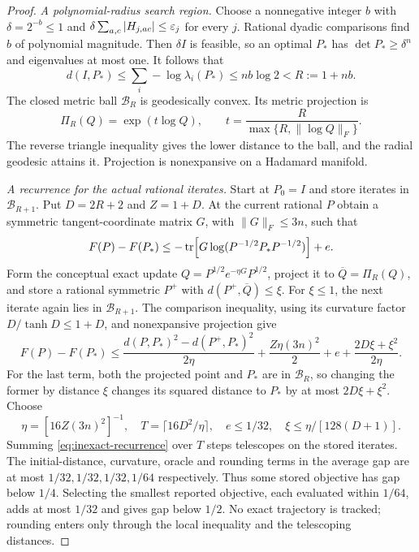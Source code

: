 \begin{proof}
\emph{A polynomial-radius search region.} Choose a nonnegative integer
$b$ with $\delta=2^{-b}\le1$ and
$\delta\sum_{a,c}|H_{j,ac}|\le\varepsilon_j$ for every $j$. Rational dyadic
comparisons find $b$ of polynomial magnitude. Then $\delta I$ is feasible,
so an optimal $P_*$ has $\det P_*\ge\delta^n$ and eigenvalues at most
one. It follows that
\[
 d(I,P_*)\le\sum_i-\log\lambda_i(P_*)\le nb\log2<R:=1+nb.
\]
The closed metric ball $\mathcal B_R$ is geodesically convex. Its metric
projection is
\begin{equation}\label{eq:radial-projection}
 \Pi_R(Q)=\exp(t\log Q),\qquad
 t=\frac{R}{\max\{R,\|\log Q\|_F\}}.
\end{equation}
The reverse triangle inequality gives the lower distance to the ball,
and the radial geodesic attains it. Projection is nonexpansive on a
Hadamard manifold.

\emph{A recurrence for the actual rational iterates.} Start at $P_0=I$
and store iterates in $\mathcal B_{R+1}$. Put $D=2R+2$ and $Z=1+D$.
At the current rational $P$ obtain a symmetric tangent-coordinate matrix
$G$, with $\|G\|_F\le3n$, such that
\begin{equation}\label{eq:inexact-subgradient}
 F(P)-F(P_*)\le-\operatorname{tr}\!\left[G\log(P^{-1/2}P_*P^{-1/2})\right]+e.
\end{equation}
Form the conceptual exact update
$Q=P^{1/2}e^{-\eta G}P^{1/2}$, project it to $\overline Q=\Pi_R(Q)$,
and store a rational symmetric $P^+$ with $d(P^+,\overline Q)\le\xi$.
For $\xi\le1$, the next iterate again lies in $\mathcal B_{R+1}$.
The comparison inequality, using its curvature factor
$D/\tanh D\le1+D$, and nonexpansive projection give
\begin{equation}\label{eq:inexact-recurrence}
 F(P)-F(P_*)\le
 \frac{d(P,P_*)^2-d(P^+,P_*)^2}{2\eta}
 +\frac{Z\eta(3n)^2}{2}+e+\frac{2D\xi+\xi^2}{2\eta}.
\end{equation}
For the last term, both the projected point and $P_*$ are in
$\mathcal B_R$, so changing the former by distance $\xi$ changes its
squared distance to $P_*$ by at most $2D\xi+\xi^2$.
Choose
\[
 \eta=[16Z(3n)^2]^{-1},\quad
 T=\lceil16D^2/\eta\rceil,\quad e\le1/32,\quad
 \xi\le\eta/[128(D+1)].
\]
Summing \eqref{eq:inexact-recurrence} over $T$ steps telescopes on the
stored iterates. The initial-distance, curvature, oracle and rounding
terms in the average gap are at most $1/32,1/32,1/32,1/64$ respectively.
Thus some stored objective has gap below $1/4$. Selecting the smallest
reported objective, each evaluated within $1/64$, adds at most $1/32$
and gives gap below $1/2$. No exact trajectory is tracked; rounding
enters only through the local inequality and the telescoping distances.


\end{proof}
